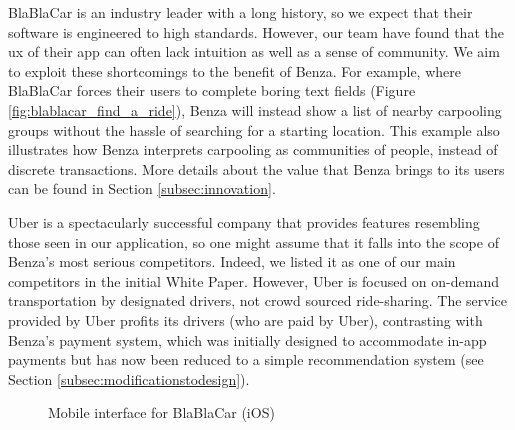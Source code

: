 \documentclass{article}
\begin{document}
    BlaBlaCar is an industry leader with a long history, so we expect that their software is engineered to high standards. However, our team have found that the \acrshort{ux} of their \gls{app} can often lack intuition as well as a sense of community. We aim to exploit these shortcomings to the benefit of Benza. For example, where BlaBlaCar forces their users to complete boring text fields (Figure \ref{fig:blablacar_find_a_ride}), Benza will instead show a list of nearby carpooling groups without the hassle of searching for a starting location. This example also illustrates how Benza interprets carpooling as communities of people, instead of discrete transactions. More details about the value that Benza brings to its users can be found in Section \ref{subsec:innovation}. \par
    
    Uber is a spectacularly successful company that provides features resembling those seen in our application, so one might assume that it falls into the scope of Benza’s most serious competitors. Indeed, we listed it as one of our main competitors in the initial White Paper. However, Uber is focused on on-demand transportation by designated drivers, not crowd sourced ride-sharing. The service provided by Uber profits its drivers (who are paid by Uber), contrasting with Benza's payment system, which was initially designed to accommodate in-app payments but has now been reduced to a simple recommendation system (see Section \ref{subsec:modificationstodesign}).\par
    
    \begin{figure}[ht]
        \caption{Mobile interface for BlaBlaCar (iOS)}
    \end{figure}
    
\end{document}
